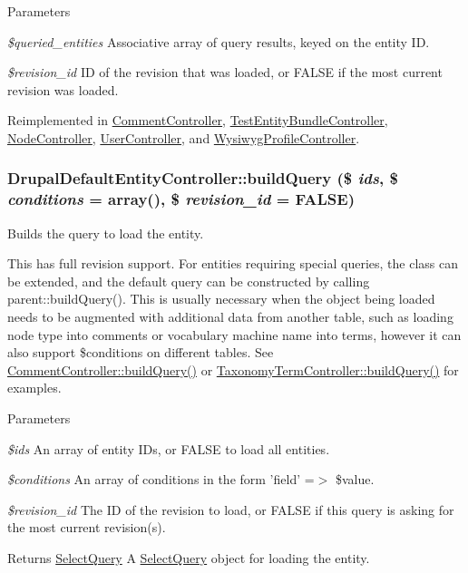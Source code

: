 \begin{DoxyParams}{Parameters}
\item[{\em \$queried\_\-entities}]Associative array of query results, keyed on the entity ID. \item[{\em \$revision\_\-id}]ID of the revision that was loaded, or FALSE if the most current revision was loaded. \end{DoxyParams}


Reimplemented in \hyperlink{classCommentController_a0a9904b695922b40ac18b5cfeb6a5b9a}{CommentController}, \hyperlink{classTestEntityBundleController_a8033ce2e754ee5c644da047738dd8835}{TestEntityBundleController}, \hyperlink{classNodeController_abdc7525854d61d63fa6ee79bb2409359}{NodeController}, \hyperlink{classUserController_a3be247594b3793977c74fc29241502ec}{UserController}, and \hyperlink{classWysiwygProfileController_a0a4f9e5386dd5e410f77ac21509cd13b}{WysiwygProfileController}.\hypertarget{classDrupalDefaultEntityController_aaa882d053aa4e04e2816b0093b79b0f8}{
\subsubsection[{buildQuery}]{\setlength{\rightskip}{0pt plus 5cm}DrupalDefaultEntityController::buildQuery (\$ {\em ids}, \/  \$ {\em conditions} = {\ttfamily array()}, \/  \$ {\em revision\_\-id} = {\ttfamily FALSE})}}
\label{classDrupalDefaultEntityController_aaa882d053aa4e04e2816b0093b79b0f8}
Builds the query to load the entity.

This has full revision support. For entities requiring special queries, the class can be extended, and the default query can be constructed by calling parent::buildQuery(). This is usually necessary when the object being loaded needs to be augmented with additional data from another table, such as loading node type into comments or vocabulary machine name into terms, however it can also support \$conditions on different tables. See \hyperlink{classCommentController_a0feb93a67f87f04b06eb64eb0d359ca7}{CommentController::buildQuery()} or \hyperlink{classTaxonomyTermController_a38102da86b43fb5b2c3c3412cb2ba3d2}{TaxonomyTermController::buildQuery()} for examples.


\begin{DoxyParams}{Parameters}
\item[{\em \$ids}]An array of entity IDs, or FALSE to load all entities. \item[{\em \$conditions}]An array of conditions in the form 'field' =$>$ \$value. \item[{\em \$revision\_\-id}]The ID of the revision to load, or FALSE if this query is asking for the most current revision(s).\end{DoxyParams}
\begin{DoxyReturn}{Returns}
\hyperlink{classSelectQuery}{SelectQuery} A \hyperlink{classSelectQuery}{SelectQuery} object for loading the entity. 
\end{DoxyReturn}


